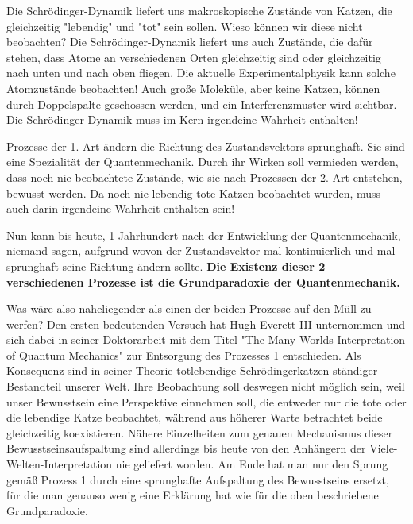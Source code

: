 \documentclass[12pt]{book}
\begin{document}
Die Schrödinger-Dynamik liefert uns makroskopische Zustände von Katzen, die gleichzeitig "lebendig" und "tot" sein sollen. Wieso können wir diese nicht beobachten? Die Schrödinger-Dynamik liefert uns auch Zustände, die dafür stehen, dass Atome an verschiedenen Orten gleichzeitig sind oder gleichzeitig nach unten und nach oben fliegen. Die aktuelle Experimentalphysik kann solche Atomzustände beobachten! Auch große Moleküle, aber keine Katzen, können durch Doppelspalte geschossen werden, und ein Interferenzmuster wird sichtbar. Die Schrödinger-Dynamik muss im Kern irgendeine Wahrheit enthalten!

Prozesse der 1. Art ändern die Richtung des Zustandsvektors sprunghaft. Sie sind eine Spezialität der Quantenmechanik. Durch ihr Wirken soll vermieden werden, dass noch nie beobachtete Zustände, wie sie nach Prozessen der 2. Art entstehen, bewusst werden. Da noch nie lebendig-tote Katzen beobachtet wurden, muss auch darin irgendeine Wahrheit enthalten sein!

Nun kann bis heute, 1 Jahrhundert nach der Entwicklung der Quantenmechanik, niemand sagen, aufgrund wovon der Zustandsvektor mal kontinuierlich und mal sprunghaft seine Richtung ändern sollte. \textbf{Die Existenz dieser 2 verschiedenen Prozesse ist die Grundparadoxie der Quantenmechanik.}


Was wäre also naheliegender als einen der beiden Prozesse auf den Müll zu werfen? Den ersten bedeutenden Versuch hat Hugh Everett III unternommen und sich dabei in seiner Doktorarbeit mit dem Titel "The Many-Worlds Interpretation
of Quantum Mechanics" zur Entsorgung des Prozesses 1 entschieden. Als Konsequenz sind in seiner Theorie totlebendige Schrödingerkatzen ständiger Bestandteil unserer Welt. Ihre Beobachtung soll deswegen nicht möglich sein, weil unser Bewusstsein eine Perspektive einnehmen soll, die entweder nur die tote oder die lebendige Katze beobachtet, während aus höherer Warte betrachtet beide gleichzeitig koexistieren. Nähere Einzelheiten zum genauen Mechanismus dieser Bewusstseinsaufspaltung sind allerdings bis heute von den Anhängern der Viele-Welten-Interpretation nie geliefert worden. Am Ende hat man nur den Sprung gemäß Prozess 1 durch eine sprunghafte Aufspaltung des Bewusstseins ersetzt, für die man genauso wenig eine Erklärung hat wie für die oben beschriebene Grundparadoxie.
\end{document}
